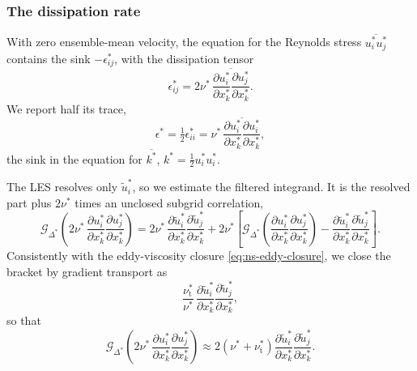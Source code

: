 \documentclass{article}
\begin{document}
\subsubsection{The dissipation rate}\label{sssec:ns-pp-quantities}
With zero ensemble-mean velocity, the equation for the Reynolds stress
$\overline{u_i^* u_j^*}$ contains the sink $-\epsilon_{ij}^*$, with the
dissipation tensor \cite{pope2000turbulent}
\begin{equation}\label{eq:ns-pp-diss-tensor}
  \epsilon_{ij}^* = 2\nu^*\, \overline{\frac{\partial u_i^*}{\partial x_k^*} \frac{\partial u_j^*}{\partial x_k^*}} .
\end{equation}
We report half its trace,
\begin{equation}\label{eq:ns-pp-diss-trace}
  \epsilon^* = \tfrac{1}{2}\epsilon_{ii}^* = \nu^*\, \overline{\frac{\partial u_i^*}{\partial x_k^*} \frac{\partial u_i^*}{\partial x_k^*}},
\end{equation}
the sink in the equation for $\overline{k^*}$,
$k^* = \tfrac{1}{2} u_i^* u_i^*$.
\par
The LES resolves only $\tilde u_i^*$, so we estimate the filtered integrand.
It is the resolved part plus $2\nu^*$ times an unclosed subgrid correlation,
\begin{equation*}
  \mathcal{G}_{\Delta^*}\!\left( 2\nu^*\, \frac{\partial u_i^*}{\partial x_k^*} \frac{\partial u_j^*}{\partial x_k^*} \right)
  = 2\nu^*\, \frac{\partial \tilde u_i^*}{\partial x_k^*} \frac{\partial \tilde u_j^*}{\partial x_k^*}
  + 2\nu^* \left[ \mathcal{G}_{\Delta^*}\!\left( \frac{\partial u_i^*}{\partial x_k^*} \frac{\partial u_j^*}{\partial x_k^*} \right)
  - \frac{\partial \tilde u_i^*}{\partial x_k^*} \frac{\partial \tilde u_j^*}{\partial x_k^*} \right] .
\end{equation*}
Consistently with the eddy-viscosity closure \eqref{eq:ns-eddy-closure}, we
close the bracket by gradient transport as
\begin{equation*}
  \frac{\nu_{\mathrm{t}}^*}{\nu^*}\, \frac{\partial \tilde u_i^*}{\partial x_k^*} \frac{\partial \tilde u_j^*}{\partial x_k^*} ,
\end{equation*}
so that
\begin{equation}\label{eq:ns-pp-diss-tensor-les}
  \mathcal{G}_{\Delta^*}\!\left( 2\nu^*\, \frac{\partial u_i^*}{\partial x_k^*} \frac{\partial u_j^*}{\partial x_k^*} \right)
  \approx 2\left( \nu^* + \nu_{\mathrm{t}}^* \right) \frac{\partial \tilde u_i^*}{\partial x_k^*} \frac{\partial \tilde u_j^*}{\partial x_k^*}.
\end{equation}
\end{document}
